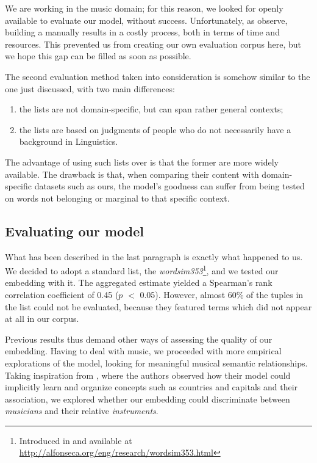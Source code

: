 We are working in the music domain; for this reason, we looked for openly available  to evaluate our model, without success. Unfortunately, as \cite{wissler2014gold} observe, building a  manually results in a costly process, both in terms of time and resources. This prevented us from creating our own evaluation corpus here, but we hope this gap can be filled as soon as possible.

The second evaluation method taken into consideration is somehow similar to the one just discussed, with two main differences:
\begin{enumerate}
\item the lists are not domain-specific, but can span rather general contexts;
\item the lists are based on judgments of people who do not necessarily have a background in Linguistics.
\end{enumerate}
The advantage of using such lists over  is that the former are more widely available. The drawback is that, when comparing their content with domain-specific datasets such as ours, the model's goodness can suffer from being tested on words not belonging or marginal to that specific context.

\subsection{Evaluating our model}\label{subsec:eval}
What has been described in the last paragraph is exactly what happened to us. We decided to adopt a standard list, the \emph{wordsim353}\footnote{Introduced in \cite{finkelstein2001placing} and available at \url{http://alfonseca.org/eng/research/wordsim353.html}}, and we tested our embedding with it. The aggregated estimate yielded a Spearman's rank correlation coefficient of 0.45 ($p$ $<$ 0.05). However, almost 60\% of the tuples in the list could not be evaluated, because they featured terms which did not appear at all in our corpus.

Previous results thus demand other ways of assessing the quality of our embedding. Having to deal with music, we proceeded with more empirical explorations of the model, looking for meaningful musical semantic relationships. Taking inspiration from \cite{mikolov2013distributed}, where the authors observed how their model could implicitly learn and organize concepts such as countries and capitals and their association, we explored whether our embedding could discriminate between \emph{musicians} and their relative \emph{instruments}.


